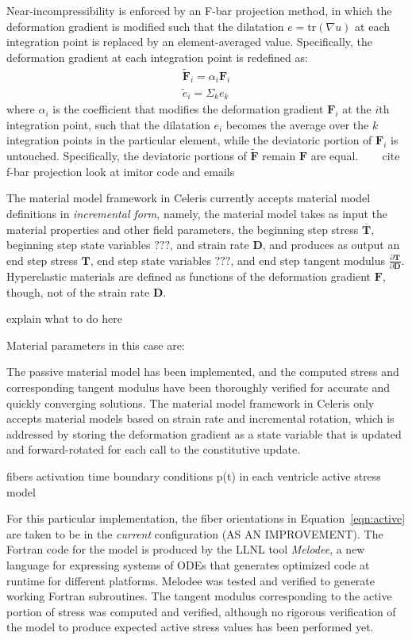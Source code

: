 Near-incompressibility is enforced by an F-bar projection method, in which the deformation gradient is modified such that the dilatation $e = \text{tr}(\nabla{u})$ at each integration point is replaced by an element-averaged value. Specifically, the deformation gradient at each integration point is redefined as:
\begin{align}
\tilde{\bm{F}}_i = \alpha_i\bm{F}_i \\
\tilde{e}_i = \Sigma_k e_k
\end{align}
where $\alpha_i$ is the coefficient that modifies the deformation gradient $\bm{F}_i$ at the $i$th integration point, such that the dilatation $e_i$ becomes the average over the $k$ integration points in the particular element, while the deviatoric portion of $\bm{F}_i$ is untouched. Specifically, the deviatoric portions of $\tilde{\bm{F}}$ remain $\bm{F}$ are equal.
~~~
cite f-bar projection
look at imitor code and emails
~~~

The material model framework in Celeris currently accepts material model definitions in \textit{incremental form}, namely, the material model takes as input the material properties and other field parameters, the beginning step stress $\overline{\bm{T}}$, beginning step state variables $???$, and strain rate $\bm{D}$, and produces as output an end step stress $\bm{T}$, end step state variables $???$, and end step tangent modulus $\frac{\partial \bm{T}}{\partial \bm{D}}$. Hyperelastic materials are defined as functions of the deformation gradient $\bm{F}$, though, not of the strain rate $\bm{D}$. 

explain what to do here

Material parameters in this case are:


The passive material model has been implemented, and the computed stress and corresponding tangent modulus have been thoroughly verified for accurate and quickly converging solutions. The material model framework in Celeris only accepts material models based on strain rate and incremental rotation, which is addressed by storing the deformation gradient as a state variable that is updated and forward-rotated for each call to the constitutive update.

fibers
activation time
boundary conditions p(t) in each ventricle
active stress model

For this particular implementation, the fiber orientations in Equation~\ref*{eqn:active} are taken to be in the \textit{current} configuration (AS AN IMPROVEMENT). The Fortran code for the model is produced by the LLNL tool \textit{Melodee}, a new language for expressing systems of ODEs that generates optimized code at runtime for different platforms. Melodee was tested and verified to generate working Fortran subroutines. The tangent modulus corresponding to the active portion of stress was computed and verified, although no rigorous verification of the model to produce expected active stress values has been performed yet.

